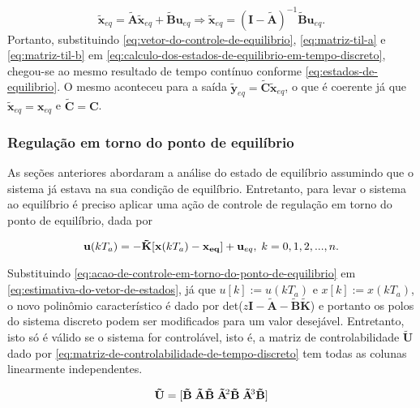 \begin{equation}
    \label{eq:calculo-dos-estados-de-equilibrio-em-tempo-discreto}
    \mathbf{\tilde{x}}_{eq} = \mathbf{\tilde{A}}\mathbf{\tilde{x}}_{eq} + \mathbf{\tilde{B}}\mathbf{u}_{eq}
    \Rightarrow
    \mathbf{\tilde{x}}_{eq} = (\mathbf{I}-\mathbf{\tilde{A}})^{-1}\mathbf{\tilde{B}}\mathbf{u}_{eq}.
\end{equation} Portanto, substituindo \ref{eq:vetor-do-controle-de-equilibrio},
\ref{eq:matriz-til-a} e \ref{eq:matriz-til-b} em
\ref{eq:calculo-dos-estados-de-equilibrio-em-tempo-discreto}, chegou-se ao mesmo
resultado de tempo contínuo conforme \ref{eq:estados-de-equilibrio}. O mesmo
aconteceu para a saída $\mathbf{\tilde{y}}_{eq} =
\mathbf{\tilde{C}}\mathbf{\tilde{x}}_{eq}$, o que é coerente já que
$\mathbf{\tilde{x}}_{eq} = \mathbf{x}_{eq}$ e $\mathbf{\tilde{C}} = \mathbf{C}$.

\subsubsection{Regulação em torno do ponto de equilíbrio}
\label{subsub:regulacao-em-torno-do-ponto-de-equilibrio}

As seções anteriores abordaram a análise do estado de equilíbrio assumindo que o
sistema já estava na sua condição de equilíbrio. Entretanto, para levar o sistema
ao equilíbrio é preciso aplicar uma ação de controle de regulação em torno do
ponto de equilíbrio, dada por

\begin{equation}
    \label{eq:acao-de-controle-em-torno-do-ponto-de-equilibrio}
    \mathbf{u}(kT_a) = -\mathbf{\tilde{K}}[\mathbf{x}(kT_a) - \mathbf{x_{eq}}]+\mathbf{u}_{eq}, 
    \thickspace k = 0, 1, 2, ..., n.
\end{equation}

Substituindo \ref{eq:acao-de-controle-em-torno-do-ponto-de-equilibrio} em
\ref{eq:estimativa-do-vetor-de-estados}, já que $u[k] := u(kT_a)$ e $x[k] :=
x(kT_a)$, o novo polinômio característico é dado por
det($z\mathbf{I}-\mathbf{\tilde{A}}-\mathbf{\tilde{B}}\mathbf{\tilde{K}}$) e
portanto os polos do sistema discreto podem ser modificados para um valor
desejável. Entretanto, isto só é válido se o sistema for controlável, isto é, a
matriz de controlabilidade $\mathbf{\tilde{U}}$ dado por
\ref{eq:matriz-de-controlabilidade-de-tempo-discreto} tem todas as colunas
linearmente independentes.

\begin{equation}
    \label{eq:matriz-de-controlabilidade-de-tempo-discreto}
    \mathbf{\tilde{U}} = [
    \mathbf{\tilde{B}}
    \thickspace
    \mathbf{\tilde{A}\tilde{B}} 
    \thickspace
    \mathbf{\tilde{A}}\negthinspace^{2}\mathbf{\tilde{B}}
    \thickspace
    \mathbf{\tilde{A}}\negthinspace^{3}\mathbf{\tilde{B}}]
\end{equation}

